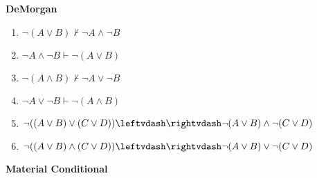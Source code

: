\begin{singlespace}
\noindent \textbf{DeMorgan}

\begin{enumerate}
\setcounter{enumi}{\value{enumi_saved}}
\item $ \neg (A \vee  B)\nvdash  \neg A \wedge  \neg B $\hfill\emph{ }  
\item $ \neg A \wedge  \neg B\vdash  \neg (A \vee  B) $\hfill\emph{ }  
\item $ \neg (A \wedge  B)\nvdash  \neg A \vee  \neg B $\hfill\emph{ }  
\item $ \neg A \vee  \neg B\vdash  \neg (A \wedge  B) $\hfill\emph{ }  
\item $ \neg ((A \vee  B) \vee  (C \vee  D))\leftvdash\rightvdash  \neg (A \vee  B) \wedge  \neg (C \vee  D) $ \hfill\emph{ }  
\item $ \neg ((A \vee  B) \wedge  (C \vee  D))\leftvdash\rightvdash  \neg (A \vee  B) \vee  \neg (C \vee  D) $ \hfill\emph{ }  
\setcounter{enumi_saved}{\value{enumi}}
\end{enumerate}

\noindent \textbf{Material Conditional}


\end{singlespace}

